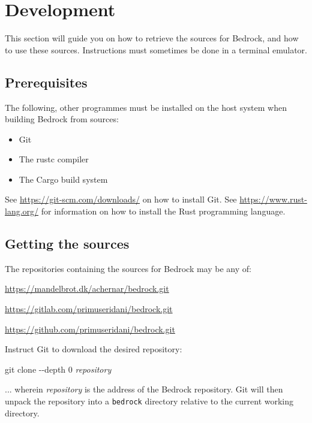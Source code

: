 \documentclass[a5paper, twoside]{report}
\begin{document}
	\clearpage
	\chapter{Development}
		\label{dev}
		This section will guide you on how to retrieve the sources for Bedrock, and how to use these sources.
		Instructions must sometimes be done in a terminal emulator.

		\section{Prerequisites}
			\label{dev:prerequisites}
			The following, other programmes must be installed on the host system when building Bedrock from sources:

			\begin{multicols}{2}
				\begin{itemize}
					\item{Git}
					\item{The rustc compiler}
					\item{The Cargo build system}
				\end{itemize}
			\end{multicols}

			See \url{https://git-scm.com/downloads/} on how to install Git.
			See \url{https://www.rust-lang.org/} for information on how to install the Rust programming language.

		\section{Getting the sources}
			\label{dev:source}
			The repositories containing the sources for Bedrock may be any of:

			\begin{mdframed}
				\url{https://mandelbrot.dk/achernar/bedrock.git}

				\url{https://gitlab.com/primuseridani/bedrock.git}

				\url{https://github.com/primuseridani/bedrock.git}
			\end{mdframed}

			Instruct Git to download the desired repository:

			\begin{mdframed}
				\ttfamily
				git clone -{}-depth 0 \textit{repository}
			\end{mdframed}

			... wherein \textit{repository} is the address of the Bedrock repository.
			Git will then unpack the repository into a \texttt{bedrock} directory relative to the current working directory.
\end{document}

